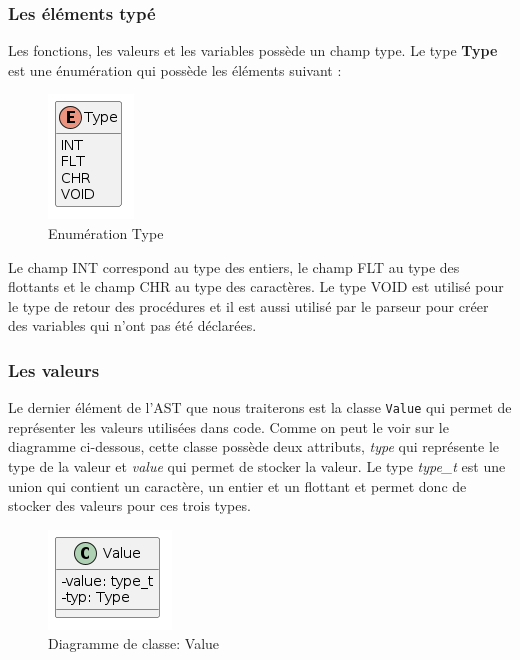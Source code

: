 \documentclass[a4paper]{article}%
\begin{document}
\subsubsection*{Les éléments typé}
\label{sec:eltTypes}

Les fonctions, les valeurs et les variables possède un champ type. Le type
\textbf{Type} est une énumération qui possède les éléments suivant :

\begin{figure}[h!]
  \begin{center}
  \includegraphics[scale=0.5]{../ressources/diagrams/Type.png}
  \caption{Enumération Type}
  \end{center}
\end{figure}

Le champ INT correspond au type des entiers, le champ FLT au type des flottants
et le champ CHR au type des caractères. Le type VOID est utilisé pour le type de
retour des procédures et il est aussi utilisé par le parseur pour créer des
variables qui n'ont pas été déclarées.

\subsubsection*{Les valeurs}

Le dernier élément de l'AST que nous traiterons est la classe \lstinline{Value}
qui permet de représenter les valeurs utilisées dans code. Comme on peut le voir
sur le diagramme ci-dessous, cette classe possède deux attributs, \textit{type}
qui représente le type de la valeur et \textit{value} qui permet de stocker la
valeur. Le type \textit{type\_t} est une union qui contient un caractère, un
entier et un flottant et permet donc de stocker des valeurs pour ces trois
types.

\begin{figure}[h!]
  \begin{center}
  \includegraphics[scale=0.5]{../ressources/diagrams/value.png}
  \caption{Diagramme de classe: Value}
  \end{center}
\end{figure}
~\\
\end{document}
